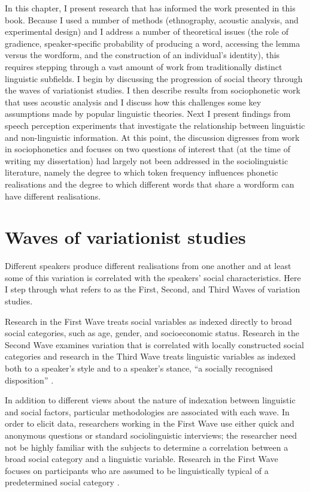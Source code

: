 In this chapter, I present research that has informed the work presented in this book. Because I used a number of methods (ethnography, acoustic analysis, and experimental design) and I address a number of theoretical issues (the role of gradience, speaker-specific probability of producing a word, accessing the lemma versus the wordform, and the construction of an individual's identity), this requires stepping through a vast amount of work from traditionally distinct linguistic subfields. I begin by discussing the progression of social theory through the waves of variationist studies. I then describe results from sociophonetic work that uses acoustic analysis and I discuss how this challenges some key assumptions made by popular linguistic theories. Next I present findings from speech perception experiments that investigate the relationship between linguistic and non-linguistic information. At this point, the discussion digresses from work in sociophonetics and focuses on two questions of interest that (at the time of writing my dissertation) had largely not been addressed in the sociolinguistic literature, namely the degree to which token frequency influences phonetic realisations and the degree to which different words that share a wordform can have different realisations. 
						   
\section{Waves of variationist studies}\label{sec:waves}

Different speakers produce different realisations from one another and at least some of this variation is correlated with the speakers' social characteristics. Here I step through what \citet{eckert2005} refers to as the First, Second, and Third Waves of variation studies. 

Research in the First Wave treats social variables as indexed directly to broad social categories, such as age, gender, and socioeconomic status. Research in the Second Wave examines variation that is correlated with locally constructed social categories and research in the Third Wave treats linguistic variables as indexed both to a speaker's style and to a speaker's stance, ``a socially recognised disposition'' \citep[2]{ochs1990}.  

In addition to different views about the nature of indexation between linguistic and social factors, particular methodologies are associated with each wave.  In order to elicit data, researchers working in the First Wave use either quick and anonymous questions or standard sociolinguistic interviews; the researcher need not be highly familiar with the subjects to determine a correlation between a broad social category and a linguistic variable. Research in the First Wave focuses on participants who are assumed to be linguistically typical of a predetermined social category \citep[35]{milroy1987}.

